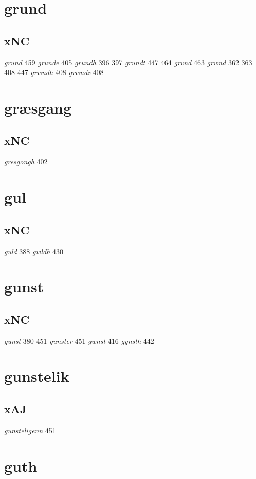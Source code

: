 \documentclass[a4paper,twocolumn]{article}
\begin{document}
\section{grund}
\label{sec:org8e8ade0}
\subsection{xNC}
\label{sec:org6daa257}
\emph{grund} 459 \emph{grunde} 405 \emph{grundh} 396 397 \emph{grundt} 447 464 \emph{grvnd} 463 \emph{grwnd} 362 363 408 447 \emph{grwndh} 408 \emph{grwndz} 408 
\section{græsgang}
\label{sec:org26d1f59}
\subsection{xNC}
\label{sec:orgb5f9a10}
\emph{gresgongh} 402 
\section{gul}
\label{sec:org6d1ceab}
\subsection{xNC}
\label{sec:orgad1ee40}
\emph{guld} 388 \emph{gwldh} 430 
\section{gunst}
\label{sec:org1aa33b5}
\subsection{xNC}
\label{sec:org3d346aa}
\emph{gunst} 380 451 \emph{gunster} 451 \emph{gwnst} 416 \emph{gynsth} 442 
\section{gunstelik}
\label{sec:orgf5cc26f}
\subsection{xAJ}
\label{sec:org5a5b112}
\emph{gunsteligenn} 451 
\section{guth}
\label{sec:orge937bd7}
\end{document}
